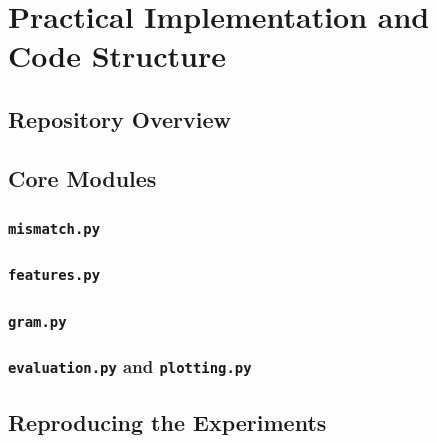 \appendix
\chapter{Practical Implementation and Code Structure}\label{ch:implementation}

\section{Repository Overview}\label{sec:repo-overview}

\section{Core Modules}\label{sec:core-modules}

\subsection{\texttt{mismatch.py}}\label{subsec:code-mismatch}

\subsection{\texttt{features.py}}\label{subsec:code-features}

\subsection{\texttt{gram.py}}\label{subsec:code-gram}

\subsection{\texttt{evaluation.py} and \texttt{plotting.py}}\label{subsec:code-eval}

\section{Reproducing the Experiments}\label{sec:reproduction}
